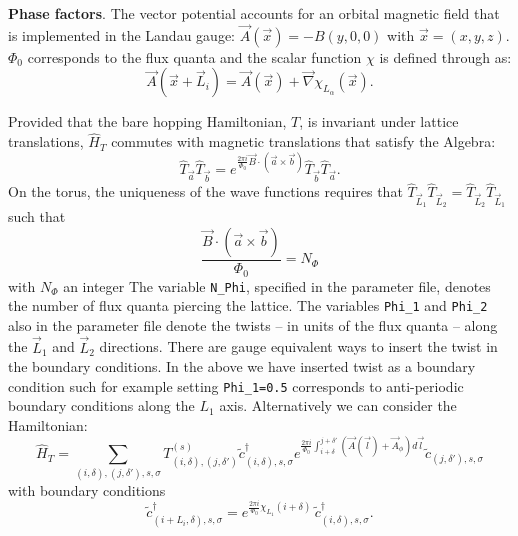 \noindent
\textbf{Phase factors}.  
The vector potential accounts for an orbital magnetic field that is implemented  in the Landau  gauge:  $\vec{A}(\vec{x})  =  -B(y,0,0) $ with $ \vec{x} = (x,y,z)$. $\Phi_0$ corresponds to the flux  quanta and the scalar function $\chi$ is defined  through as:
\begin{equation}
	\vec{A}( \vec{x} + \vec{L}_{i} )  = \vec{A}( \vec{x} )   +  \vec{\nabla} \chi_{L_{\alpha}}(\vec{x}). 
\end{equation}

 Provided that the bare hopping Hamiltonian, $T$,  is invariant under lattice translations, $\hat{H}_T$ commutes with magnetic translations  that satisfy the  Algebra: 
\begin{equation}
	\hat{T}_{\vec{a}} \hat{T}_{\vec{b}} =  e^{ \frac{2 \pi i}{\Phi_0}   \vec{B} \cdot \left( \vec{a} \times \vec{b} \right) }  \hat{T}_{\vec{b}} \hat{T}_{\vec{a}}. 
\end{equation}
On the  torus, the uniqueness of the wave functions requires that  $\hat{T}_{\vec{L}_1} \hat{T}_{\vec{L}_2}  =   \hat{T}_{\vec{L}_2} \hat{T}_{\vec{L}_1} $ such
that
\begin{equation}
	 \frac{\vec{B} \cdot \left( \vec{a} \times \vec{b}  \right) }{\Phi_0 } = N_{\Phi}   
\end{equation}
with  $N_\Phi $ an integer  The variable \texttt{N\_Phi},   specified in the parameter file,   denotes the number of flux quanta piercing the lattice.    The variables \texttt{Phi\_1}  and   \texttt{Phi\_2} also   in the parameter file denote  the twists  -- in units of the flux quanta  --  along the $\vec{L}_1$ and  $\vec{L}_2$ directions.     There are gauge  equivalent ways to insert the  twist in the boundary conditions. In the above we  have inserted   twist as a boundary condition such  for example setting  \texttt{Phi\_1=0.5}  corresponds to anti-periodic boundary conditions along the $L_1$  axis.   Alternatively we  can  consider the 
Hamiltonian:
\begin{equation}
	   \hat{H}_T = \sum_{(i,\delta), (j,\delta'), s, \sigma}    T_{(i,\delta), (j,\delta')}^{(s)}    \tilde{c}^{\dagger}_{(i,\delta),s,\sigma }   e^{\frac{2 \pi i}{\Phi_0} \int_{i + \delta}^{j + \delta'} \left(  \vec{A}(\vec{l})  + \vec{A}_{\phi} \right)  d \vec{l}} \tilde{c}^{}_{(j,\delta'),s,\sigma }
\end{equation}
with boundary conditions 
\begin{equation}
	\tilde{c}^{\dagger}_{(i + L_i,\delta) ,s,\sigma }   =  e^{\frac{2 \pi i }{\Phi_0} \chi_{L_1} ( i + \delta ) } \, \tilde{c}^{\dagger}_{(i,\delta) ,s,\sigma }.
\end{equation}
